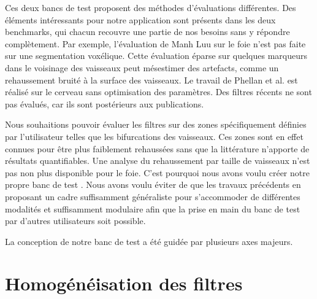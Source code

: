 Ces deux bancs de test proposent des méthodes d'évaluations différentes. Des éléments intéressants pour notre application sont présents dans les deux benchmarks, qui chacun recouvre une partie de nos besoins sans y répondre complètement. Par exemple, l'évaluation de Manh Luu sur le foie n'est pas faite sur une segmentation voxélique. Cette évaluation éparse sur quelques marqueurs dans le voisinage des vaisseaux peut mésestimer des artefacts, comme un rehaussement bruité à la surface des vaisseaux. Le travail de Phellan et al. est réalisé sur le cerveau sans optimisation des paramètres. Des filtres récents ne sont pas évalués, car ils sont postérieurs aux publications. 

Nous souhaitions pouvoir évaluer les filtres sur des zones spécifiquement définies par l'utilisateur telles que les bifurcations des vaisseaux. Ces zones sont en effet connues pour être plus faiblement rehaussées sans que la littérature n'apporte de résultats quantifiables. Une analyse du rehaussement par taille de vaisseaux n'est pas non plus disponible pour le foie. C'est pourquoi nous avons voulu créer notre propre banc de test . Nous avons voulu éviter de  que les travaux précédents en proposant un cadre suffisamment généraliste pour s'accommoder de différentes modalités et suffisamment modulaire afin que la prise en main du banc de test par d'autres utilisateurs soit possible.

La conception de notre banc de test a été guidée par plusieurs axes majeurs.
  

\section{Homogénéisation des filtres}
\label{sec:Filtres}


